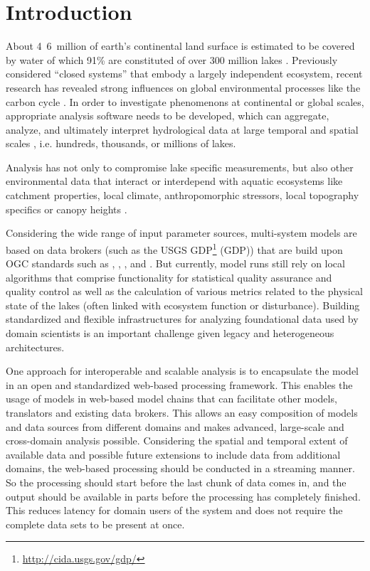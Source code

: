 
\chapter{Introduction}

About \unit{4.6 million}{\kilo\square\metre} of earth's continental land surface is estimated to be covered by water of which 91\% are constituted of over 300 million lakes \citep{downing2006global}. Previously considered ``closed systems'' that embody a largely independent ecosystem, recent research has revealed strong influences on global environmental processes like the carbon cycle \citep{cole2007plumbing}. In order to investigate phenomenons at continental or global scales, appropriate analysis software needs to be developed, which can aggregate, analyze, and ultimately interpret hydrological data at large temporal and spatial scales \citep{read2013upscaling}, i.e. hundreds, thousands, or millions of lakes.

Analysis has not only to compromise lake specific measurements, but also other environmental data that interact or interdepend with aquatic ecosystems like catchment properties, local climate, anthropomorphic stressors, local topography specifics or canopy heights \citep{read2013upscaling}.

Considering the wide range of input parameter sources, multi-system models are based on data brokers (such as the \ac{USGS} \acl{GDP}\footnote{\url{http://cida.usgs.gov/gdp/} \lastretrievedp} (\acs{GDP})) that are build upon \ac{OGC} standards such as , , ,  and . But currently, model runs still rely on local algorithms that comprise functionality for statistical quality assurance and quality control as well as the calculation of various metrics related to the physical state of the lakes (often linked with ecosystem function or disturbance). Building standardized and flexible infrastructures for analyzing foundational data used by domain scientists is an important challenge given legacy and heterogeneous architectures.

One approach for interoperable and scalable analysis is to encapsulate the model in an open and standardized web-based processing framework. This enables the usage of models in web-based model chains that can facilitate other models, translators and existing data brokers. This allows an easy composition of models and data sources from different domains and makes advanced, large-scale and cross-domain analysis possible. Considering the spatial and temporal extent of available data and possible future extensions to include data from additional domains, the web-based processing should be conducted in a streaming manner. So the processing should start before the last chunk of data comes in, and the output should be available in parts before the processing has completely finished. This reduces latency for domain users of the system and does not require the complete data sets to be present at once.

